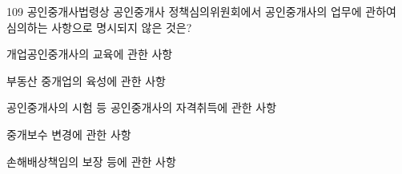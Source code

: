 \begin{question}{109}
공인중개사법령상 공인중개사 정책심의위원회에서 공인중개사의 업무에 관하여 심의하는 사항으로 명시되지 않은 것은?
\begin{choices}
  \item 개업공인중개사의 교육에 관한 사항
  \item 부동산 중개업의 육성에 관한 사항
  \item 공인중개사의 시험 등 공인중개사의 자격취득에 관한 사항
  \item 중개보수 변경에 관한 사항
  \item 손해배상책임의 보장 등에 관한 사항
\end{choices}
\end{question}
